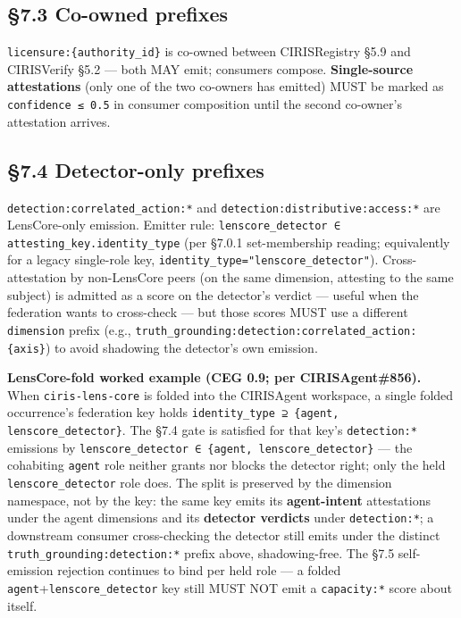 \documentclass[10pt]{article}
\begin{document}
\subsection*{§7.3 Co-owned prefixes}


\texttt{licensure:\{authority\_id\}} is co-owned between CIRISRegistry §5.9 and CIRISVerify §5.2 — both MAY emit; consumers compose. \textbf{Single-source attestations} (only one of the two co-owners has emitted) MUST be marked as \texttt{confidence ≤ 0.5} in consumer composition until the second co-owner's attestation arrives.


\subsection*{§7.4 Detector-only prefixes}


\texttt{detection:correlated\_action:*} and \texttt{detection:distributive:access:*} are LensCore-only emission. Emitter rule: \texttt{lenscore\_detector ∈ attesting\_key.identity\_type} (per §7.0.1 set-membership reading; equivalently for a legacy single-role key, \texttt{identity\_type="lenscore\_detector"}). Cross-attestation by non-LensCore peers (on the same dimension, attesting to the same subject) is admitted as a score on the detector's verdict — useful when the federation wants to cross-check — but those scores MUST use a different \texttt{dimension} prefix (e.g., \texttt{truth\_grounding:detection:correlated\_action:\{axis\}}) to avoid shadowing the detector's own emission.


\textbf{LensCore-fold worked example (CEG 0.9; per CIRISAgent\#856).} When \texttt{ciris-lens-core} is folded into the CIRISAgent workspace, a single folded occurrence's federation key holds \texttt{identity\_type ⊇ \{agent, lenscore\_detector\}}. The §7.4 gate is satisfied for that key's \texttt{detection:*} emissions by \texttt{lenscore\_detector ∈ \{agent, lenscore\_detector\}} — the cohabiting \texttt{agent} role neither grants nor blocks the detector right; only the held \texttt{lenscore\_detector} role does. The split is preserved by the dimension namespace, not by the key: the same key emits its \textbf{agent-intent} attestations under the agent dimensions and its \textbf{detector verdicts} under \texttt{detection:*}; a downstream consumer cross-checking the detector still emits under the distinct \texttt{truth\_grounding:detection:*} prefix above, shadowing-free. The §7.5 self-emission rejection continues to bind per held role — a folded \texttt{agent}+\texttt{lenscore\_detector} key still MUST NOT emit a \texttt{capacity:*} score about itself.
\end{document}
